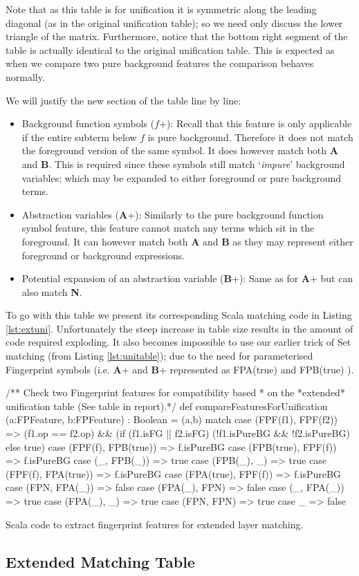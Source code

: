 Note that as this table is for unification it is symmetric along the leading diagonal (as in
the original unification table); so we need only discuss the lower triangle of the matrix.
Furthermore, notice that the bottom right segment of the table is actually identical to
the original unification table. This is expected as when we compare two
pure background features the comparison behaves normally.

We will justify the new section of the table line by line:
\begin{itemize}
\item Background function symbols ($f$+): Recall that this feature is only applicable
if the entire subterm below $f$ is pure background. Therefore it does not
match the foreground version of the same symbol. It does however match both
\textbf{A} and \textbf{B}. This is required since these symbols still match `\emph{impure}' background variables;
which may be expanded to either foreground or pure background terms.
\item Abstraction variables (\textbf{A}+): Similarly to the pure background function symbol
feature, this feature cannot match any terms which sit in the foreground. It can however
match both \textbf{A} and \textbf{B} as they may represent either foreground or background
expressions.
\item Potential expansion of an abstraction variable (\textbf{B}+): Same as for \textbf{A}+
but can also match \textbf{N}.
\end{itemize}

To go with this table we present its corresponding Scala matching code in Listing \ref{lst:extuni}.
Unfortunately the steep increase in table size results in the amount of code required exploding.
It also becomes impossible to use our earlier trick of Set matching (from Listing \ref{lst:unitable}); due to the need for parameterised
Fingerprint symbols (i.e. \textbf{A}+ and \textbf{B}+ represented as FPA(true) and FPB(true) ).
\begin{listing}[H]
\begin{scalacode}
 /** Check two Fingerprint features for compatibility based
   * on the *extended* unification table (See table in report).*/
  def compareFeaturesForUnification
      (a:FPFeature, b:FPFeature) : Boolean = 
  (a,b) match {
    case (FPF(f1), FPF(f2))    => (f1.op == f2.op) && 
                                  (if (f1.isFG || f2.isFG) 
                                      (!f1.isPureBG && !f2.isPureBG)
                                   else true)
    case (FPF(f), FPB(true)) => f.isPureBG
    case (FPB(true), FPF(f)) => f.isPureBG
    case (_, FPB(_))         => true
    case (FPB(_), _)         => true
    case (FPF(f), FPA(true)) => f.isPureBG
    case (FPA(true), FPF(f)) => f.isPureBG
    case (FPN, FPA(_))       => false
    case (FPA(_), FPN)       => false
    case (_, FPA(_))         => true
    case (FPA(_), _)         => true
    case (FPN, FPN)          => true
    case _                   => false
  }
\end{scalacode}
\caption{Scala code to extract fingerprint features for extended layer matching.}
\label{lst:extuni}
\end{listing}

\subsection{Extended Matching Table}

